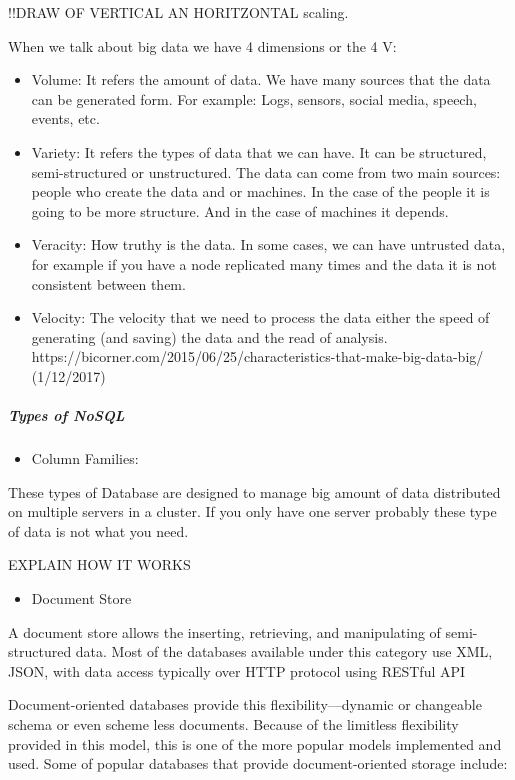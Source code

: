 \documentclass[]{article}
\providecommand{\tightlist}{%
  \setlength{\itemsep}{0pt}\setlength{\parskip}{0pt}}
\let\oldsubparagraph\subparagraph
\renewcommand{\subparagraph}[1]{\oldsubparagraph{#1}\mbox{}}
\begin{document}
!!DRAW OF VERTICAL AN HORITZONTAL scaling.

When we talk about big data we have 4 dimensions or the 4 V:

\begin{itemize}
\item
  Volume: It refers the amount of data. We have many sources that the
  data can be generated form. For example: Logs, sensors, social media,
  speech, events, etc.
\item
  Variety: It refers the types of data that we can have. It can be
  structured, semi-structured or unstructured. The data can come from
  two main sources: people who create the data and or machines. In the
  case of the people it is going to be more structure. And in the case
  of machines it depends.
\item
  Veracity: How truthy is the data. In some cases, we can have untrusted
  data, for example if you have a node replicated many times and the
  data it is not consistent between them.
\item
  Velocity: The velocity that we need to process the data either the
  speed of generating (and saving) the data and the read of analysis.\\
  https://bicorner.com/2015/06/25/characteristics-that-make-big-data-big/
  (1/12/2017)
\end{itemize}

\hypertarget{types-of-nosql}{%
\subparagraph{Types of NoSQL}\label{types-of-nosql}}

\begin{itemize}
\tightlist
\item
  Column Families:
\end{itemize}

These types of Database are designed to manage big amount of data
distributed on multiple servers in a cluster. If you only have one
server probably these type of data is not what you need.

EXPLAIN HOW IT WORKS

\begin{itemize}
\tightlist
\item
  Document Store
\end{itemize}

A document store allows the inserting, retrieving, and manipulating of
semi-structured data. Most of the databases available under this
category use XML, JSON, with data access typically over HTTP protocol
using RESTful API

Document-oriented databases provide this flexibility---dynamic or
changeable schema or even scheme less documents. Because of the
limitless flexibility provided in this model, this is one of the more
popular models implemented and used. Some of popular databases that
provide document-oriented storage include:
\end{document}
